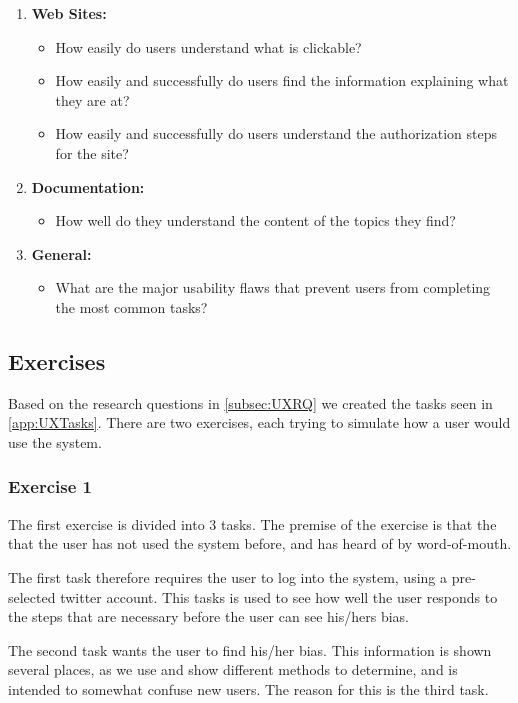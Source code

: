 \begin{enumerate}
  \item \textbf{Web Sites:} 
	\begin{itemize}
      \item How easily do users understand what is clickable?
      \item How easily and successfully do users find the information
      explaining what they are at?
      \item How easily and successfully do users understand the authorization
      steps for the site?
    \end{itemize}
  \item \textbf{Documentation:}
    \begin{itemize}
      \item How well do they understand the content of the topics they find?
    \end{itemize}
  \item \textbf{General:}
    \begin{itemize}
      \item What are the major usability flaws that prevent users from
      completing the most common tasks?
    \end{itemize}
\end{enumerate}

\subsection{Exercises}
Based on the research questions in \autoref{subsec:UXRQ} we created the tasks
seen in \autoref{app:UXTasks}. There are two exercises, each trying to simulate
how a user would use the system.\nl

\subsubsection{Exercise 1}\label{subsub:UXE1}
The first exercise is divided into 3 tasks. The premise of the exercise is that
the that the user has not used the system before, and has heard of by
word-of-mouth.\nl

The first task therefore requires the user to log into the system, using a
pre-selected twitter account. This tasks is used to see how well the user
responds to the steps that are necessary before the user can see his/hers
bias.\nl

The second task wants the user to find his/her bias. This information is shown
several places, as we use and show different methods to determine, and
is intended to somewhat confuse new users. The reason for this is the third
task.\nl

